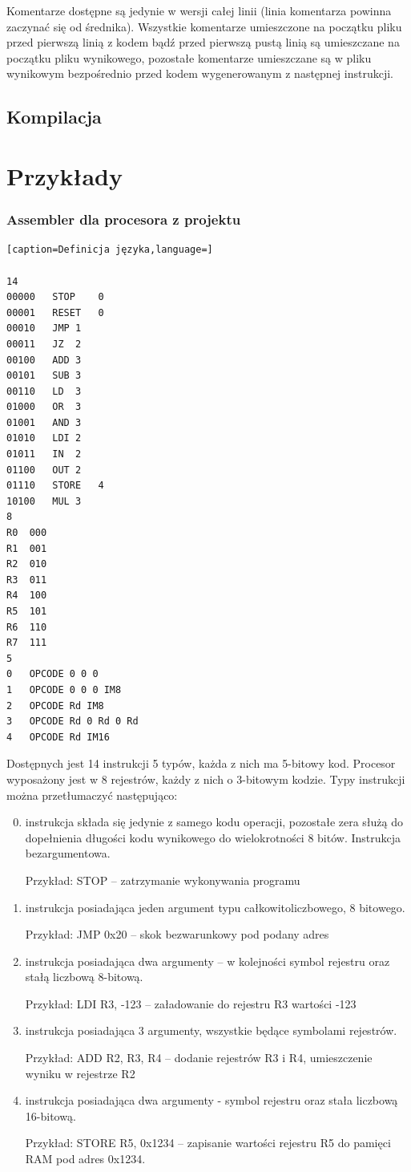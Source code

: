 \documentclass[a4paper,12pt]{report}
\begin{document}
Komentarze dostępne są jedynie w wersji całej linii (linia komentarza powinna zaczynać się od średnika). Wszystkie komentarze umieszczone na początku pliku przed pierwszą linią z kodem bądź przed pierwszą pustą linią są umieszczane na początku pliku wynikowego, pozostałe komentarze umieszczane są w pliku wynikowym bezpośrednio przed kodem wygenerowanym z następnej instrukcji.

\subsection{Kompilacja}

\section{Przykłady}

\label{sec:asmex}
\subsubsection{Assembler dla procesora z projektu}
\lstset{
tabsize=6
}\begin{lstlisting}[caption=Definicja języka,language=]

14
00000	STOP	0
00001	RESET	0
00010	JMP	1
00011	JZ	2
00100	ADD	3
00101	SUB	3
00110	LD	3
01000	OR	3
01001	AND	3
01010	LDI	2
01011	IN	2
01100	OUT	2
01110	STORE	4
10100	MUL	3
8
R0	000
R1	001
R2	010
R3	011
R4	100
R5	101
R6	110
R7	111
5
0	OPCODE 0 0 0
1	OPCODE 0 0 0 IM8
2	OPCODE Rd IM8
3	OPCODE Rd 0 Rd 0 Rd
4	OPCODE Rd IM16
\end{lstlisting}

Dostępnych jest 14 instrukcji 5 typów, każda z nich ma 5-bitowy kod. Procesor wyposażony jest w 8 rejestrów, każdy z nich o 3-bitowym kodzie. Typy instrukcji można przetłumaczyć następująco:
\begin{enumerate}
\setcounter{enumi}{-1}
  \item instrukcja składa się jedynie z samego kodu operacji, pozostałe zera służą do dopełnienia długości kodu wynikowego do wielokrotności 8 bitów. Instrukcja bezargumentowa.

  Przykład: STOP -- zatrzymanie wykonywania programu
  \item instrukcja posiadająca jeden argument typu całkowitoliczbowego, 8 bitowego. 

  Przykład: JMP 0x20 -- skok bezwarunkowy pod podany adres
  \item instrukcja posiadająca dwa argumenty -- w kolejności symbol rejestru oraz stałą liczbową 8-bitową.
  
  Przykład: LDI R3, -123 -- załadowanie do rejestru R3 wartości -123
  \item instrukcja posiadająca 3 argumenty, wszystkie będące symbolami rejestrów.

  Przykład: ADD R2, R3, R4 -- dodanie rejestrów R3 i R4, umieszczenie wyniku w rejestrze R2
  \item instrukcja posiadająca dwa argumenty - symbol rejestru oraz stała liczbową 16-bitową.

  Przykład: STORE R5, 0x1234 -- zapisanie wartości rejestru R5 do pamięci RAM pod adres 0x1234.
\end{enumerate}
\end{document}
